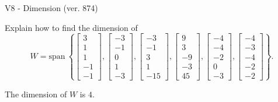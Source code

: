 \begin{exercise}
  \begin{exerciseTitle}V8 - Dimension (ver. 874)\end{exerciseTitle}
  \begin{exerciseStatement}
    Explain how to find the dimension of 
\[W=\mathrm{span}\ \left\{\left[\begin{array}{r}
3 \\
1 \\
1 \\
-1 \\
-1
\end{array}\right] , \left[\begin{array}{r}
-3 \\
-1 \\
0 \\
1 \\
-3
\end{array}\right] , \left[\begin{array}{r}
-3 \\
-1 \\
3 \\
1 \\
-15
\end{array}\right] , \left[\begin{array}{r}
9 \\
3 \\
-9 \\
-3 \\
45
\end{array}\right] , \left[\begin{array}{r}
-4 \\
-4 \\
-2 \\
0 \\
-3
\end{array}\right] , \left[\begin{array}{r}
-4 \\
-3 \\
-4 \\
-2 \\
-2
\end{array}\right]\right\}.\]



  \end{exerciseStatement}
  \begin{exerciseAnswer}
   The dimension of \(W\) is  \(4\).
  


  \end{exerciseAnswer}
\end{exercise}
